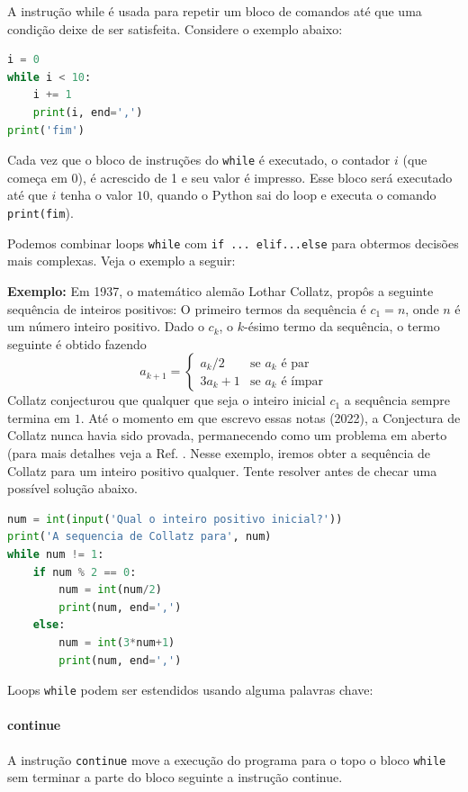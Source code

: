 A instrução while é usada para repetir um bloco de comandos até que uma condição
deixe de ser satisfeita. Considere o exemplo abaixo:
\begin{lstlisting}[language=Python]
i = 0
while i < 10:
    i += 1
    print(i, end=',')
print('fim')
\end{lstlisting}
Cada vez que o bloco de instruções do {\tt while} é executado, o contador $i$ (que começa em 0), é acrescido de 1 e seu valor é impresso. Esse bloco será executado até que $i$ tenha o valor $10$, quando o Python sai do loop e executa o comando {\tt print(fim}).

Podemos combinar loops {\tt while} com {\tt if ... elif...else} para obtermos decisões mais complexas. Veja o exemplo a seguir:

{\bf Exemplo:} Em 1937, o matemático alemão Lothar Collatz, propôs a seguinte sequência de inteiros positivos: O primeiro termos da sequência é $c_1 =n$, onde $n$ é um número inteiro positivo. Dado o $c_k$, o $k$-ésimo termo da sequência, o termo seguinte é obtido fazendo
\[a_{k+1} =\left\{\begin{array}{cl} a_k/2 & \textrm{se } a_k\textrm{ é par}\\
3a_k+1 & \textrm{se } a_k \textrm{ é ímpar}
\end{array}\right.\]
Collatz conjecturou que qualquer que seja o inteiro inicial $c_1$ a sequência sempre termina em $1$. Até o momento em que escrevo essas notas (2022), a Conjectura de Collatz nunca havia sido provada, permanecendo como um problema em aberto (para mais detalhes veja a Ref. \cite{collatzconjecture}. Nesse exemplo, iremos obter a sequência de Collatz para um inteiro positivo qualquer. Tente resolver antes de checar uma possível solução abaixo.

\begin{lstlisting}[language=Python, frame=lines,basicstyle=\footnotesize, caption={Testando a conjectura de Collatz}, label={lst:Collatz}]
num = int(input('Qual o inteiro positivo inicial?'))
print('A sequencia de Collatz para', num)
while num != 1:
    if num % 2 == 0:
        num = int(num/2)
        print(num, end=',')
    else:
        num = int(3*num+1)
        print(num, end=',')
\end{lstlisting}

Loops {\tt while} podem ser estendidos usando alguma palavras chave:

\paragraph{continue} A instrução {\tt continue} move a execução do programa para o topo
o bloco {\tt while} sem terminar a parte do bloco seguinte a instrução continue.

